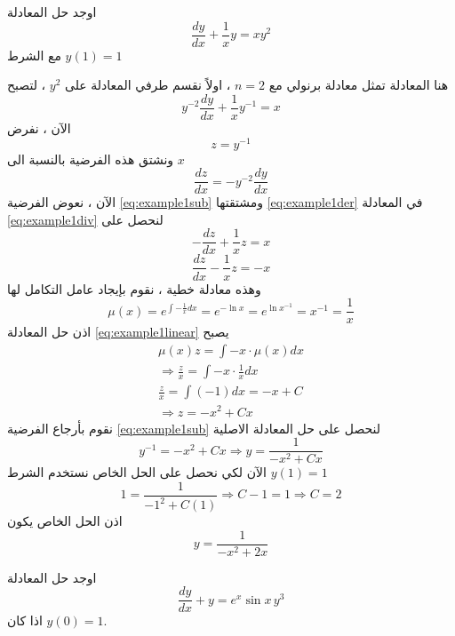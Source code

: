 \newpage
\setcounter{example}{0}
\setcounter{equation}{0}
\begin{example}
	اوجد حل المعادلة 
	\[
	\frac{dy}{dx} + \frac{1}{x} y = xy^2
	\]
	مع الشرط $y(1) = 1 $
\end{example}
\begin{solution}
	هنا المعادلة تمثل معادلة برنولي مع $n=2 $ ، اولاً نقسم طرفي المعادلة على $y^2 $ ، لتصبح
	\begin{equation}
		\label{eq:example1div}
		y^{-2} \frac{dy}{dx} + \frac{1}{x} y^{-1} = x
	\end{equation}
	الآن ، نفرض
	\begin{equation}
		\label{eq:example1sub}
		z=y^{-1}
	\end{equation}
	ونشتق هذه الفرضية بالنسبة الى $x$
	\begin{equation}
		\label{eq:example1der}
		\frac{dz}{dx} =  -y^{-2} \frac{dy}{dx}
	\end{equation}
	الآن ، نعوض الفرضية \eqref{eq:example1sub} ومشتقتها \eqref{eq:example1der} في المعادلة \eqref{eq:example1div} لنحصل على 
	\[
	-\frac{dz}{dx} + \frac{1}{x} z =x
	\]
	\begin{equation}
		\label{eq:example1linear}
		\frac{dz}{dx} - \frac{1}{x} z = -x
	\end{equation}
	وهذه معادلة خطية ، نقوم بإيجاد عامل التكامل لها
	\[
	\mu(x) = e^{\int -\frac{1}{x} dx} = e^{-\ln x} = e^{\ln x^{-1}} = x^{-1} = \frac{1}{x}
	\]
	اذن حل المعادلة \eqref{eq:example1linear} يصبح
	\begin{align*}
		\mu(x) z = \int -x \cdot \mu(x) dx\\
		\Rightarrow \frac{z}{x} = \int -x \cdot \frac{1}{x} dx\\
		\frac{z}{x} = \int (-1) dx = -x + C\\
		\Rightarrow z = -x^2 + Cx
	\end{align*}
	نقوم بأرجاع الفرضية \eqref{eq:example1sub} لنحصل على حل المعادلة الاصلية
	\[
	y^{-1} = -x^2 + Cx \Rightarrow y = \frac{1}{-x^2 + Cx}
	\]
	الآن لكي نحصل على الحل الخاص نستخدم الشرط $y(1) = 1 $ 
	\[
	1= \frac{1}{-1^2 + C(1)} \Rightarrow C-1=1\Rightarrow C=2
	\]
	اذن الحل الخاص يكون 
	\[
	y = \frac{1}{-x^2 + 2x}
	\]
\end{solution}
\setcounter{equation}{0}
\begin{example}
	اوجد حل المعادلة 
	\[
	\frac{dy}{dx} + y = e^{x}\sin x \, y^3
	\]
	اذا كان $y(0)=1$.
\end{example}

